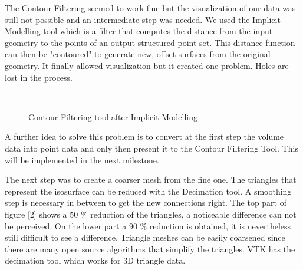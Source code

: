 The Contour Filtering seemed to work fine but the visualization of our data was still not possible
and an intermediate step was needed. We used the Implicit Modelling tool which is a filter that
computes the distance from the input geometry to the points of an output structured point set.
This distance function can then be "contoured" to generate new, offset surfaces from the original
geometry. It finally allowed visualization but it created one problem. Holes are lost in
the process.

\begin{figure}
\centering
   \\
   \caption{Contour Filtering tool after Implicit Modelling}
\end{figure}

A further idea to solve this problem is to convert at the first step the volume data into point data
and only then present it to the Contour Filtering Tool. This will be implemented in the next
milestone.

The next step was to create a coarser mesh from the fine one. The triangles that represent the
isosurface can be reduced with the Decimation tool. A smoothing step is necessary in between
to get the new connections right. The top part of figure [2] shows a 50 \% reduction of the
triangles, a noticeable difference can not be perceived. On the lower part a 90 \% reduction is
obtained, it is nevertheless still difficult to see a difference. Triangle meshes can be easily
coarsened since there are many open source algorithms that simplify the triangles. VTK has the
decimation tool which works for 3D triangle data.


